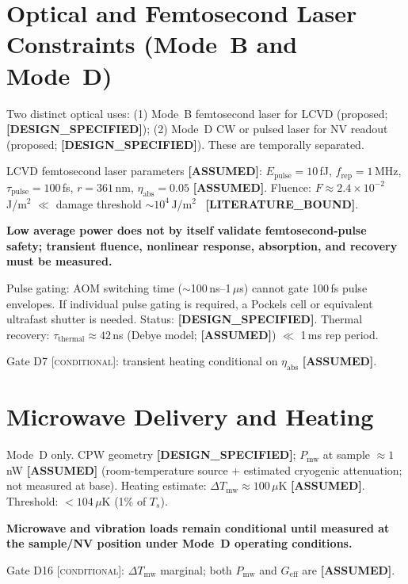\documentclass[12pt,a4paper]{article}
\newcommand{\conditional}{\textsc{conditional}}
\newcommand{\assumed}{\textbf{[ASSUMED]}}
\newcommand{\designspec}{\textbf{[DESIGN\_SPECIFIED]}}
\newcommand{\litbound}{\textbf{[LITERATURE\_BOUND]}}
\begin{document}
\section{Optical and Femtosecond Laser Constraints (Mode~B and Mode~D)}
\label{sec:optical}

Two distinct optical uses:
(1) Mode~B femtosecond laser for LCVD (proposed; \designspec{});
(2) Mode~D CW or pulsed laser for NV readout (proposed; \designspec{}).
These are temporally separated.

LCVD femtosecond laser parameters \assumed{}: $E_\mathrm{pulse}=10$\,fJ,
$f_\mathrm{rep}=1$\,MHz, $\tau_\mathrm{pulse}=100$\,fs, $r=361$\,nm,
$\eta_\mathrm{abs}=0.05$ \assumed{}.
Fluence: $F \approx 2.4\times10^{-2}$\,J/m$^2$ $\ll$ damage threshold
$\sim10^4$\,J/m$^2$~\cite{Ozkan2012,Shinoda2009} \litbound{}.

\textbf{Low average power does not by itself validate femtosecond-pulse safety;
transient fluence, nonlinear response, absorption, and recovery must be measured.}

Pulse gating: AOM switching time ($\sim$100\,ns--1\,$\mu$s) cannot gate
100\,fs pulse envelopes.
If individual pulse gating is required, a Pockels cell or equivalent ultrafast
shutter is needed.
Status: \designspec{}.
Thermal recovery: $\tau_\mathrm{thermal} \approx 42$\,ns (Debye model; \assumed{})
$\ll$ 1\,ms rep period.

Gate D7 [\conditional{}]: transient heating conditional on $\eta_\mathrm{abs}$ \assumed{}.

\section{Microwave Delivery and Heating}
\label{sec:mw}

Mode~D only.
CPW geometry \designspec{}; $P_\mathrm{mw}$ at sample $\approx 1$\,nW \assumed{}
(room-temperature source + estimated cryogenic attenuation; not measured at base).
Heating estimate: $\Delta T_\mathrm{mw} \approx 100\,\mu$K \assumed{}.
Threshold: $<104\,\mu$K (1\% of $T_s$).

\textbf{Microwave and vibration loads remain conditional until measured at the
sample/NV position under Mode~D operating conditions.}

Gate D16 [\conditional{}]: $\Delta T_\mathrm{mw}$ marginal; both $P_\mathrm{mw}$
and $G_\mathrm{eff}$ are \assumed{}.
\end{document}
